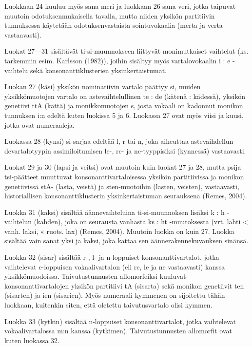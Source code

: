 \documentclass[free]{flammie}
\begin{document}
Luokkaan 24 kuuluu myös sana meri ja luokkaan 26 sana veri, jotka taipuvat
muutoin odotuksenmukaisella tavalla, mutta niiden yksikön partitiivin tunnuksessa käytetään odotuksenvastaista sointuvokaalia (merta ja verta vastaavasti).

Luokat 27—31 sisältävät ti-si-muunnokseen liittyvät monimutkaiset vaihtelut
(ks. tarkemmin esim. Karlsson (1982)), joihin sisältyy myös vartalovokaalin i :
e -vaihtelu sekä konsonanttiklusterien yksinkertaistumat.

Luokan 27 (käsi) yksikön nominatiivin vartalo päättyy si, muiden yksikkömuotojen vartalo on astevaihtelullinen te : de (kätenä : kädessä), yksikön genetiivi
ttA (kättä) ja monikkomuotojen s, josta vokaali on kadonnut monikon tunnuksen
i:n edeltä kuten luokissa 5 ja 6. Luokassa 27 ovat myös viisi ja kuusi, jotka ovat
numeraaleja.

Luokassa 28 (kynsi) si-sarjaa edeltää l, r tai n, joka aiheuttaa astevaihdellun devartalotyypin assimiloitumisen le-, re- ja ne-tyyppisiksi (kynnessä) vastaavasti.

Luokat 29 ja 30 (lapsi ja veitsi) ovat muutoin kuin luokat 27 ja 28, mutta psija tsi-päätteet muuttuvat konsonanttivartaloisessa yksikön partitiivissa ja monikon
genetiivissä stA- (lasta, veistä) ja sten-muotoihin (lasten, veisten), vastaavasti, historiallisen konsonanttiklusterin yksinkertaistuman seurauksena (Remes, 2004).

Luokka 31 (kaksi) sisältää äännevaihteluina ti-si-muunnoksen lisäksi k : h -vaihtelun (kahden), joka on seurausta vanhasta ks : ht -muutoksesta (vrt. lahti < vanh.
laksi, « ruots. lax) (Remes, 2004). Muutoin luokka on kuin 27. Luokka sisältää
vain sanat yksi ja kaksi, joka kattaa sen äännerakennekuvauksen sinänsä.

Luokka 32 (sisar) sisältää r-, l- ja n-loppuiset konsonanttivartalot, jotka vaihtelevat e-loppuisen vokaalivartalon (eli re, le ja ne vastaavasti) kanssa yksikkömuodoissa. Taivutustunnusten allomorfeiksi kuuluvat konsonanttivartalojen yksikön partitiivi tA (sisarta) sekä monikon genetiivit ten (sisarten) ja ien (sisarien).
Myös numeraali kymmenen on sijoitettu tähän luokkaan, kuitenkin siten, että oletettu taivutusvartalo olisi kymmen.

Luokka 33 (kytkin) sisältää n-loppuiset konsonanttivartalot, jotka vaihtelevat vokaalivartalossa m:n kanssa (kytkimen). Taivutustunnusten allomorfit ovat kuten
luokassa 32.
\end{document}
